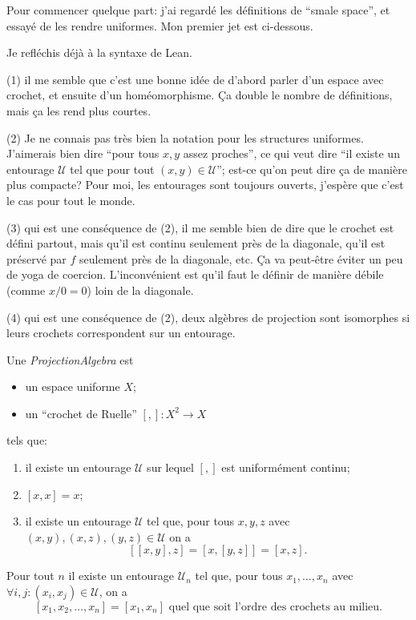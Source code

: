 \documentclass{amsart}
\begin{document}
Pour commencer quelque part: j'ai regard\'e les d\'efinitions de ``smale space'', et essay\'e de les rendre uniformes. Mon premier jet est ci-dessous.

Je refl\'echis d\'ej\`a \`a la syntaxe de Lean.

(1) il me semble que c'est une bonne id\'ee de d'abord parler d'un espace avec crochet, et ensuite d'un hom\'eomorphisme. \c{C}a double le nombre de d\'efinitions, mais \c{c}a les rend plus courtes.

(2) Je ne connais pas tr\`es bien la notation pour les structures uniformes. J'aimerais bien dire ``pour tous $x,y$ assez proches'', ce qui veut dire ``il existe un entourage $\mathcal U$ tel que pour tout $(x,y)\in\mathcal U$''; est-ce qu'on peut dire \c{c}a de mani\`ere plus compacte? Pour moi, les entourages sont toujours ouverts, j'esp\`ere que c'est le cas pour tout le monde.

(3) qui est une cons\'equence de (2), il me semble bien de dire que le crochet est d\'efini partout, mais qu'il est continu seulement pr\`es de la diagonale, qu'il est pr\'eserv\'e par $f$ seulement pr\`es de la diagonale, etc. \c{C}a va peut-\^etre \'eviter un peu de yoga de coercion. L'inconv\'enient est qu'il faut le d\'efinir de mani\`ere d\'ebile (comme $x/0=0$) loin de la diagonale.

(4) qui est une cons\'equence de (2), deux alg\`ebres de projection sont isomorphes si leurs crochets correspondent sur un entourage.

\begin{defn}
  Une \emph{ProjectionAlgebra} est
  \begin{itemize}
  \item un espace uniforme $X$;
  \item un ``crochet de Ruelle'' $[,]\colon X^2\to X$
  \end{itemize}
  tels que:
  \begin{enumerate}
  \item il existe un entourage $\mathcal U$ sur lequel $[,]$ est uniform\'ement continu;
  \item $[x,x]=x$;
  \item il existe un entourage $\mathcal U$ tel que, pour tous $x,y,z$ avec $(x,y),(x,z),(y,z)\in\mathcal U$ on a
    \[[[x,y],z]=[x,[y,z]]=[x,z].\]
  \end{enumerate}
\end{defn}

\begin{lem}
  Pour tout $n$ il existe un entourage $\mathcal U_n$ tel que, pour tous $x_1,\dots,x_n$ avec $\forall i,j:(x_i,x_j)\in\mathcal U$, on a
  \[[x_1,x_2,\dots,x_n]=[x_1,x_n]\text{ quel que soit l'ordre des crochets au milieu}.\]
\end{lem}
\end{document}
